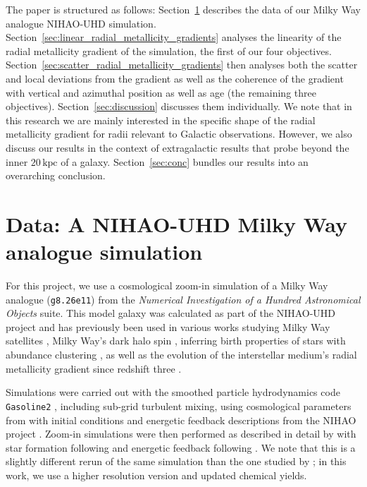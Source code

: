 \documentclass[twocolumn,apj,numberedappendix,appendixfloats,twocolappendix]{openjournal}
\begin{document}
\begin{CJK*}{UTF8}{gbsn}
The paper is structured as follows: Section~\ref{sec:data} describes the data of our Milky Way analogue NIHAO-UHD simulation. Section~\ref{sec:linear_radial_metallicity_gradients} analyses the linearity of the radial metallicity gradient of the simulation, the first of our four objectives. Section~\ref{sec:scatter_radial_metallicity_gradients} then analyses both the scatter and local deviations from the gradient as well as the coherence of the gradient with vertical and azimuthal position as well as age (the remaining three objectives). Section~\ref{sec:discussion} discusses them individually. We note that in this research we are mainly interested in the specific shape of the radial metallicity gradient for radii relevant to Galactic observations. However, we also discuss our results in the context of extragalactic results that probe beyond the inner $20\,\mathrm{kpc}$ of a galaxy. Section~\ref{sec:conc} bundles our results into an overarching conclusion. 

\section{Data: A NIHAO-UHD Milky Way analogue simulation} \label{sec:data}

For this project, we use a cosmological zoom-in simulation of a Milky Way analogue (\texttt{g8.26e11}) from the \textit{Numerical Investigation of a Hundred Astronomical Objects} \citep[NIHAO,][]{Wang2015} suite. This model galaxy was calculated as part of the NIHAO-UHD project \citep{Buck2020b} and has previously been used in various works studying Milky Way satellites \citep{Buck2019b}, Milky Way's dark halo spin \citep{Obreja2022}, inferring birth properties of stars with abundance clustering \citep{Ratcliffe2022}, as well as the evolution of the interstellar medium's radial metallicity gradient since redshift three \citep{Ratcliffe2024b}.

Simulations were carried out with the smoothed particle hydrodynamics code \texttt{Gasoline2} \citep{Wadsley2017}, including sub-grid turbulent mixing, using cosmological parameters from \citet{Planck2014} with initial conditions and energetic feedback descriptions from the NIHAO project \citep{Wang2015}. Zoom-in simulations were then performed as described in detail by \citet{Buck2021} with star formation following \citet{Stinson2006} and energetic feedback following \citet{Stinson2013}. We note that this is a slightly different rerun of the same simulation than the one studied by \citet{Buder2024}; in this work, we use a higher resolution version and updated chemical yields.


\end{CJK*}
\end{document}
